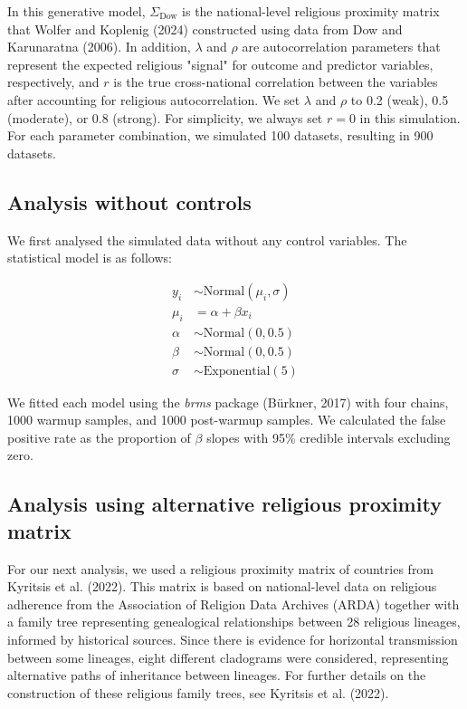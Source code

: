 \documentclass[
  11pt,
]{article}
\begin{document}
In this generative model, $\Sigma_\text{Dow}$ is the national-level religious
proximity matrix that Wolfer and Koplenig (2024) constructed using data from Dow
and Karunaratna (2006). In addition, $\lambda$ and $\rho$ are autocorrelation 
parameters that represent the expected religious "signal" for outcome and 
predictor variables, respectively, and $r$ is the true cross-national 
correlation between the variables after accounting for religious
autocorrelation. We set $\lambda$ and $\rho$ to 0.2 (weak), 0.5 (moderate), or 
0.8 (strong). For simplicity, we always set $r = 0$ in this simulation. For each
parameter combination, we simulated 100 datasets, resulting in 900 datasets.

\subsection*{Analysis without controls}

We first analysed the simulated data without any control variables. The
statistical model is as follows:

\begin{align}
y_i &\sim \text{Normal}(\mu_i, \sigma) \nonumber \\
\mu_i &= \alpha + \beta x_i \nonumber \\
\alpha &\sim \text{Normal}(0, 0.5) \nonumber \\
\beta &\sim \text{Normal}(0, 0.5) \nonumber \\
\sigma &\sim \text{Exponential}(5) \nonumber
\end{align}

We fitted each model using the \textit{brms} package (Bürkner, 2017) with four 
chains, 1000 warmup samples, and 1000 post-warmup samples. We calculated the 
false positive rate as the proportion of $\beta$ slopes with 95\% credible 
intervals excluding zero.

\subsection*{Analysis using alternative religious proximity matrix}

For our next analysis, we used a religious proximity matrix of countries from 
Kyritsis et al. (2022). This matrix is based on national-level data on religious
adherence from the Association of Religion Data Archives (ARDA) together with a
family tree representing genealogical relationships between 28 religious
lineages, informed by historical sources. Since there is evidence for horizontal
transmission between some lineages, eight different cladograms were considered,
representing alternative paths of inheritance between lineages. For further
details on the construction of these religious family trees, see Kyritsis et al.
(2022).
\end{document}
